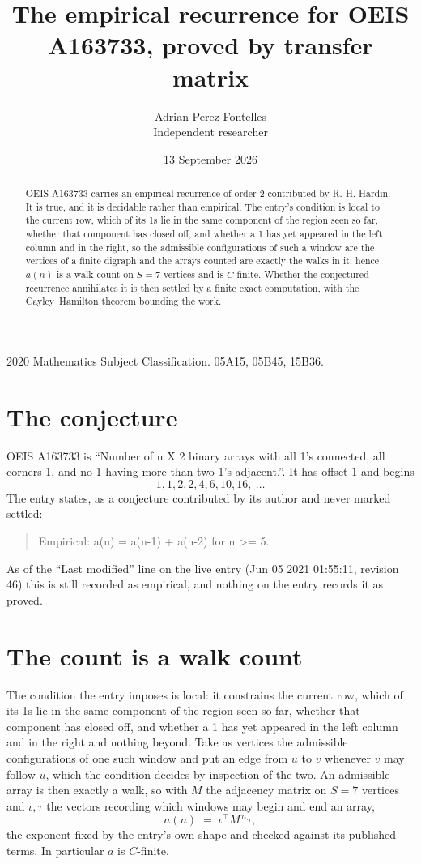 \documentclass[11pt,a4paper]{article}
\title{The empirical recurrence for OEIS A163733, proved by transfer matrix}
\author{Adrian Perez Fontelles\\ \small Independent researcher}
\date{13 September 2026}
\theoremstyle{plain}
\theoremstyle{definition}
\begin{document}
\maketitle

\begin{abstract}
OEIS A163733 carries an empirical recurrence of order $2$ contributed by R. H. Hardin. It is
true, and it is decidable rather than empirical. The entry's condition is local to the current row, which of its 1s lie in the same component of the region seen so far, whether that component has closed off, and whether a 1 has yet appeared in the left column and in the right, so
the admissible configurations of such a window are the vertices of a finite digraph and the
arrays counted are exactly the walks in it; hence $a(n)$ is a walk count on $S=7$ vertices
and is $C$-finite. Whether the conjectured recurrence annihilates it is then settled by a
finite exact computation, with the Cayley--Hamilton theorem bounding the work.
\end{abstract}

\noindent\small 2020 Mathematics Subject Classification. 05A15, 05B45, 15B36.\normalsize

\section{The conjecture}

OEIS A163733 is ``Number of n X 2 binary arrays with all 1's connected, all corners 1, and no 1 having more than two 1's adjacent.''. It has offset $1$ and begins
\[
1, 1, 2, 2, 4, 6, 10, 16,\ \dots
\]
The entry states, as a conjecture contributed by its author and never marked settled:
\begin{quote}
Empirical: a(n) = a(n-1) + a(n-2) for n >= 5.
\end{quote}
As of the ``Last modified'' line on the live entry (Jun 05 2021 01:55:11, revision 46) this is still
recorded as empirical, and nothing on the entry records it as proved.

\section{The count is a walk count}

The condition the entry imposes is local: it constrains the current row, which of its 1s lie in the same component of the region seen so far, whether that component has closed off, and whether a 1 has yet appeared in the left column and in the right and nothing beyond. Take as
vertices the admissible configurations of one such window and put an edge from $u$ to $v$
whenever $v$ may follow $u$, which the condition decides by inspection of the two. An
admissible array is then exactly a walk, so with $M$ the adjacency matrix on $S=7$ vertices
and $\iota,\tau$ the vectors recording which windows may begin and end an array,
\[
a(n)\;=\;\iota^{\!\top}M^{\,n}\tau ,
\]
the exponent fixed by the entry's own shape and checked against its published terms. In
particular $a$ is $C$-finite.
\end{document}

